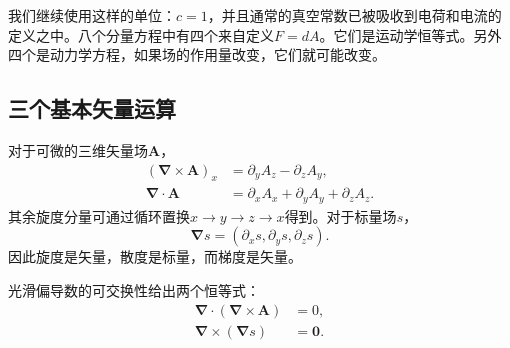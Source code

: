 \begin{classroomqa}
\end{classroomqa}

\begin{classroomqa}
\end{classroomqa}

我们继续使用这样的单位：\(c=1\)，并且通常的真空常数已被吸收到电荷和电流的定义之中。八个分量方程中有四个来自定义\(F=dA\)。它们是运动学恒等式。另外四个是动力学方程，如果场的作用量改变，它们就可能改变。

\subsection{三个基本矢量运算}

对于可微的三维矢量场\(\mathbf A\)，
\begin{align}
(\boldsymbol\nabla\times\mathbf A)_x
&=
\partial_yA_z-\partial_zA_y,
\\
\boldsymbol\nabla\cdot\mathbf A
&=
\partial_xA_x+\partial_yA_y+\partial_zA_z.
\end{align}
其余旋度分量可通过循环置换\(x\to y\to z\to x\)得到。对于标量场\(s\)，
\begin{equation}
\boldsymbol\nabla s
=
(\partial_xs,\partial_ys,\partial_zs).
\end{equation}
因此旋度是矢量，散度是标量，而梯度是矢量。

\begin{classroomqa}
\end{classroomqa}

光滑偏导数的可交换性给出两个恒等式：
\begin{align}
\boldsymbol\nabla\cdot
(\boldsymbol\nabla\times\mathbf A)
&=0,
\label{eq:div-curl}
\\
\boldsymbol\nabla\times
(\boldsymbol\nabla s)
&=\mathbf0.
\label{eq:curl-grad}
\end{align}

\begin{classroomqa}
\end{classroomqa}

